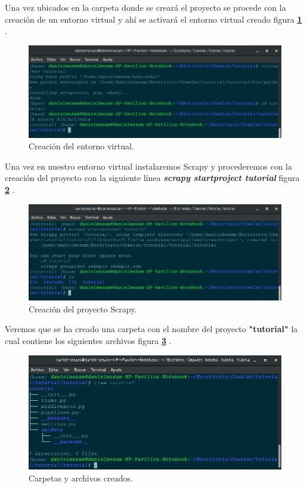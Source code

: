 Una vez ubicados en la carpeta donde se creará el proyecto se procede con la creación de un entorno virtual y ahí se activará el entorno virtual 
creado figura \textbf{\ref{fig:dos}} .

\begin{figure}[H]
    \centering
    \includegraphics[scale=.35]{imagenes/Capitulo5/2}
    \caption{Creación del entorno virtual.}
    \label{fig:dos}
  \end{figure}

Una vez en nuestro entorno virtual instalaremos Scrapy y procederemos con la creación del proyecto con la siguiente línea
\textbf{\textit{scrapy startproject tutorial}} figura \textbf{\ref{fig:tres}} .

\begin{figure}[H]
    \centering
    \includegraphics[scale=.35]{imagenes/Capitulo5/3}
    \caption{Creación del proyecto Scrapy.}
    \label{fig:tres}
  \end{figure}

Veremos que se ha creado una carpeta con el nombre del proyecto \textbf{"tutorial"} la cual contiene los siguientes archivos figura \textbf{\ref{fig:cuatro}} .

\begin{figure}[H]
    \centering
    \includegraphics[scale=.35]{imagenes/Capitulo5/4}
    \caption{Carpetas y archivos creados.}
    \label{fig:cuatro}
  \end{figure}

